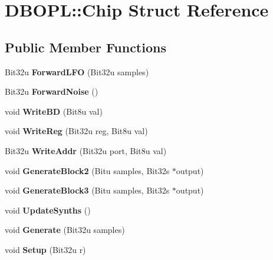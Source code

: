 \hypertarget{structDBOPL_1_1Chip}{\section{D\-B\-O\-P\-L\-:\-:Chip Struct Reference}
\label{structDBOPL_1_1Chip}
}
\subsection*{Public Member Functions}
\begin{DoxyCompactItemize}
\item 
\hypertarget{structDBOPL_1_1Chip_aa6fa687111a426a5f78e167fa257ab3c}{Bit32u {\bfseries Forward\-L\-F\-O} (Bit32u samples)}\label{structDBOPL_1_1Chip_aa6fa687111a426a5f78e167fa257ab3c}

\item 
\hypertarget{structDBOPL_1_1Chip_a24786d7a165991bee7de4fcc0d771b51}{Bit32u {\bfseries Forward\-Noise} ()}\label{structDBOPL_1_1Chip_a24786d7a165991bee7de4fcc0d771b51}

\item 
\hypertarget{structDBOPL_1_1Chip_a2860097b5662864a601a5e88366d830e}{void {\bfseries Write\-B\-D} (Bit8u val)}\label{structDBOPL_1_1Chip_a2860097b5662864a601a5e88366d830e}

\item 
\hypertarget{structDBOPL_1_1Chip_a91898e7f05d8dffc30731970a554ef7e}{void {\bfseries Write\-Reg} (Bit32u reg, Bit8u val)}\label{structDBOPL_1_1Chip_a91898e7f05d8dffc30731970a554ef7e}

\item 
\hypertarget{structDBOPL_1_1Chip_ab7a01561768354f16b8851a0d21b7a2c}{Bit32u {\bfseries Write\-Addr} (Bit32u port, Bit8u val)}\label{structDBOPL_1_1Chip_ab7a01561768354f16b8851a0d21b7a2c}

\item 
\hypertarget{structDBOPL_1_1Chip_a306dc034dce06ffed5b08e6295100b70}{void {\bfseries Generate\-Block2} (Bitu samples, Bit32s $\ast$output)}\label{structDBOPL_1_1Chip_a306dc034dce06ffed5b08e6295100b70}

\item 
\hypertarget{structDBOPL_1_1Chip_aa2ce55695961a65cc79e86ff110cdb35}{void {\bfseries Generate\-Block3} (Bitu samples, Bit32s $\ast$output)}\label{structDBOPL_1_1Chip_aa2ce55695961a65cc79e86ff110cdb35}

\item 
\hypertarget{structDBOPL_1_1Chip_a2de016e86cff2a981f5f6595bf5c159e}{void {\bfseries Update\-Synths} ()}\label{structDBOPL_1_1Chip_a2de016e86cff2a981f5f6595bf5c159e}

\item 
\hypertarget{structDBOPL_1_1Chip_aa5e8f70f9b01aba04e5f0c78e96414e8}{void {\bfseries Generate} (Bit32u samples)}\label{structDBOPL_1_1Chip_aa5e8f70f9b01aba04e5f0c78e96414e8}

\item 
\hypertarget{structDBOPL_1_1Chip_a7ae0e48e86d15d09fb90deb101258eef}{void {\bfseries Setup} (Bit32u r)}\label{structDBOPL_1_1Chip_a7ae0e48e86d15d09fb90deb101258eef}

\end{DoxyCompactItemize}
